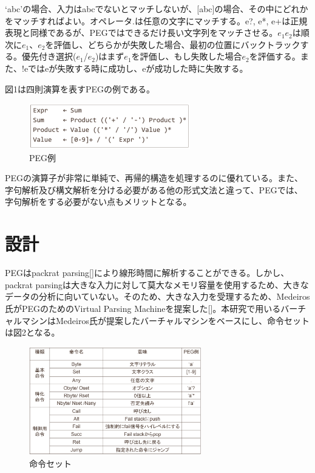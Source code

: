 \documentclass[submit]{ipsj}
\begin{document}
`abc'の場合、入力はabcでないとマッチしないが、[abc]の場合、その中にどれかをマッチすればよい。オペレータ.は任意の文字にマッチする。e?, e*, e+は正規表現と同様であるが、PEGではできるだけ長い文字列をマッチさせる。$e_1$$e_2$は順次に$e_1$、$e_2$を評価し、どちらかが失敗した場合、最初の位置にバックトラックする。優先付き選択($e_1$/$e_2$)はまず$e_1$を評価し、もし失敗した場合$e_2$を評価する。また、!eではeが失敗する時に成功し、eが成功した時に失敗する。

図1は四則演算を表すPEGの例である。

\begin{figure}[h]
    \begin{center}
        \includegraphics[width=70mm]{./fig/PEG_sample}
       \caption{PEG例}
    \end{center}
\end{figure}

PEGの演算子が非常に単純で、再帰的構造を処理するのに優れている。また、字句解析及び構文解析を分ける必要がある他の形式文法と違って、PEGでは、字句解析をする必要がない点もメリットとなる。

\section{設計}

PEGはpackrat parsing[]により線形時間に解析することができる。しかし、packrat parsingは大きな入力に対して莫大なメモリ容量を使用するため、大きなデータの分析に向いていない。そのため、大きな入力を受理するため、Medeiros氏がPEGのためのVirtual Parsing Machineを提案した[]。本研究で用いるバーチャルマシンはMedeiros氏が提案したバーチャルマシンをベースにし、命令セットは図2となる。

\begin{figure}[h]
    \begin{center}
        \includegraphics[width=75mm]{./fig/VM1}
       \caption{命令セット}
    \end{center}
\end{figure}
\end{document}
